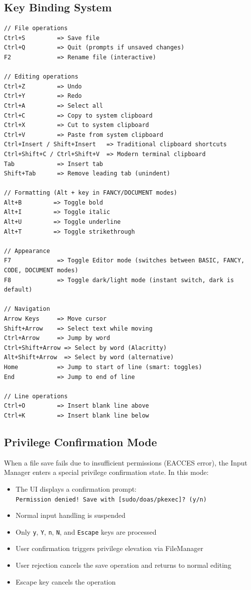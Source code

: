 \documentclass[12pt,a4paper,oneside,openany]{report}
\begin{document}
\subsection{Key Binding System}
\begin{lstlisting}
// File operations
Ctrl+S         => Save file
Ctrl+Q         => Quit (prompts if unsaved changes)
F2             => Rename file (interactive)

// Editing operations
Ctrl+Z         => Undo
Ctrl+Y         => Redo
Ctrl+A         => Select all
Ctrl+C         => Copy to system clipboard
Ctrl+X         => Cut to system clipboard
Ctrl+V         => Paste from system clipboard
Ctrl+Insert / Shift+Insert   => Traditional clipboard shortcuts
Ctrl+Shift+C / Ctrl+Shift+V  => Modern terminal clipboard
Tab            => Insert tab
Shift+Tab      => Remove leading tab (unindent)

// Formatting (Alt + key in FANCY/DOCUMENT modes)
Alt+B         => Toggle bold
Alt+I         => Toggle italic
Alt+U         => Toggle underline
Alt+T         => Toggle strikethrough

// Appearance
F7			   => Toggle Editor mode (switches between BASIC, FANCY, CODE, DOCUMENT modes)
F8             => Toggle dark/light mode (instant switch, dark is default)

// Navigation
Arrow Keys     => Move cursor
Shift+Arrow    => Select text while moving
Ctrl+Arrow     => Jump by word
Ctrl+Shift+Arrow => Select by word (Alacritty)
Alt+Shift+Arrow  => Select by word (alternative)
Home           => Jump to start of line (smart: toggles)
End            => Jump to end of line

// Line operations
Ctrl+O         => Insert blank line above
Ctrl+K         => Insert blank line below
\end{lstlisting}

\subsection{Privilege Confirmation Mode}

When a file save fails due to insufficient permissions (EACCES error), the Input Manager enters a special privilege confirmation state. In this mode:

\begin{itemize}
	\item The UI displays a confirmation prompt:\\
	\texttt{Permission denied! Save with [sudo/doas/pkexec]? (y/n)}
	\item Normal input handling is suspended
	\item Only \texttt{y}, \texttt{Y}, \texttt{n}, \texttt{N}, and \texttt{Escape} keys are processed
	\item User confirmation triggers privilege elevation via FileManager
	\item User rejection cancels the save operation and returns to normal editing
	\item Escape key cancels the operation
\end{itemize}
\end{document}
